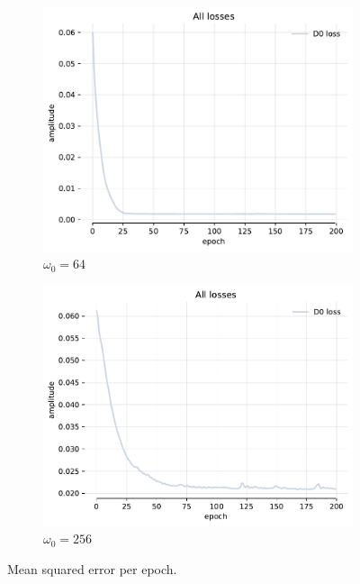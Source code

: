 \begin{figure}[h]
    \centering
    \begin{subfigure}[b]{0.45\textwidth}
        \centering
        \includegraphics[width=\textwidth]{img/ch4/loss-noise-hl0-hf512-w64.pdf}
        \caption{$\omega_0=64$}
        \label{fig:loss-hf512-w64}
    \end{subfigure}
    \begin{subfigure}[b]{0.45\textwidth}
        \centering
        \includegraphics[width=\textwidth]{img/ch4/loss-noise-hl0-hf512-w256.pdf}
        \caption{$\omega_0=256$}
        \label{fig:loss-hf512-w256}
    \end{subfigure}
    \caption{Mean squared error per epoch.}
    \label{f:loss-noise-comparison-hl0-hf512}
\end{figure}


